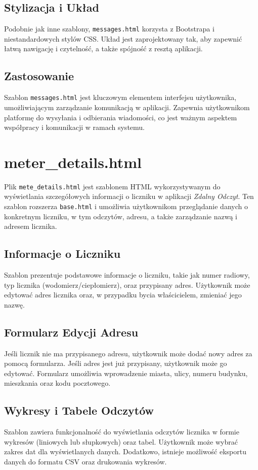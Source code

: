 \documentclass[12pt,a4paper]{report}
\begin{document}
\subsection{Stylizacja i Układ}
Podobnie jak inne szablony, \texttt{messages.html} korzysta z Bootstrapa i niestandardowych stylów CSS. Układ jest zaprojektowany tak, aby zapewnić łatwą nawigację i czytelność, a także spójność z resztą aplikacji.

\subsection{Zastosowanie}
Szablon \texttt{messages.html} jest kluczowym elementem interfejsu użytkownika, umożliwiającym zarządzanie komunikacją w aplikacji. Zapewnia użytkownikom platformę do wysyłania i odbierania wiadomości, co jest ważnym aspektem współpracy i komunikacji w ramach systemu.

\section{meter\_details.html}
\label{sec:meterdetails}
Plik \texttt{mete\_details.html} jest szablonem HTML wykorzystywanym do wyświetlania szczegółowych informacji o liczniku w aplikacji \textit{Zdalny Odczyt}. Ten szablon rozszerza \texttt{base.html} i umożliwia użytkownikom przeglądanie danych o konkretnym liczniku, w tym odczytów, adresu, a także zarządzanie nazwą i adresem licznika.

\subsection{Informacje o Liczniku}
Szablon prezentuje podstawowe informacje o liczniku, takie jak numer radiowy, typ licznika (wodomierz/ciepłomierz), oraz przypisany adres. Użytkownik może edytować adres licznika oraz, w przypadku bycia właścicielem, zmieniać jego nazwę.

\subsection{Formularz Edycji Adresu}
Jeśli licznik nie ma przypisanego adresu, użytkownik może dodać nowy adres za pomocą formularza. Jeśli adres jest już przypisany, użytkownik może go edytować. Formularz umożliwia wprowadzenie miasta, ulicy, numeru budynku, mieszkania oraz kodu pocztowego.

\subsection{Wykresy i Tabele Odczytów}
Szablon zawiera funkcjonalność do wyświetlania odczytów licznika w formie wykresów (liniowych lub słupkowych) oraz tabel. Użytkownik może wybrać zakres dat dla wyświetlanych danych. Dodatkowo, istnieje możliwość eksportu danych do formatu CSV oraz drukowania wykresów.
\end{document}
